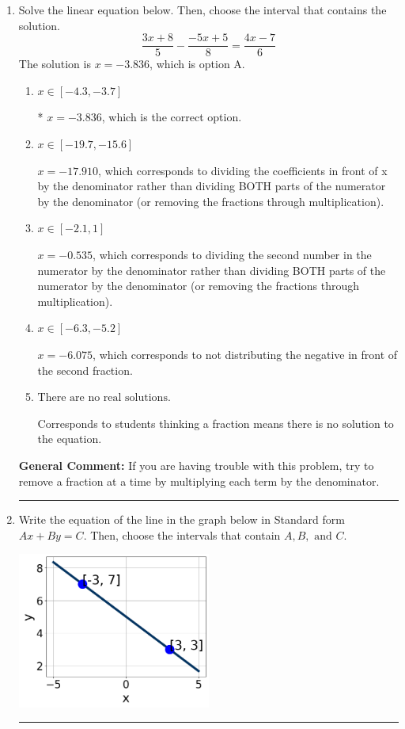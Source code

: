 \documentclass{extbook}[14pt]
\newcommand{\litem}[1]{\item #1

\rule{\textwidth}{0.4pt}}
\begin{document}
\begin{enumerate}\litem{
Solve the linear equation below. Then, choose the interval that contains the solution.
\[ \frac{3x + 8}{5} - \frac{-5x + 5}{8} = \frac{4x -7}{6} \]The solution is \( x = -3.836 \), which is option A.\begin{enumerate}[label=\Alph*.]
\item \( x \in [-4.3, -3.7] \)

* $x = -3.836$, which is the correct option.
\item \( x \in [-19.7, -15.6] \)

 $x = -17.910$, which corresponds to dividing the coefficients in front of x by the denominator rather than dividing BOTH parts of the numerator by the denominator (or removing the fractions through multiplication).
\item \( x \in [-2.1, 1] \)

 $x = -0.535$, which corresponds to dividing the second number in the numerator by the denominator rather than dividing BOTH parts of the numerator by the denominator (or removing the fractions through multiplication).
\item \( x \in [-6.3, -5.2] \)

 $x = -6.075$, which corresponds to not distributing the negative in front of the second fraction.
\item \( \text{There are no real solutions.} \)

Corresponds to students thinking a fraction means there is no solution to the equation.
\end{enumerate}

\textbf{General Comment:} If you are having trouble with this problem, try to remove a fraction at a time by multiplying each term by the denominator.
}
\litem{
Write the equation of the line in the graph below in Standard form $Ax+By=C$. Then, choose the intervals that contain $A, B, \text{ and } C$.

\begin{center}
    \includegraphics[width=0.5\textwidth]{../Figures/linearGraphToStandardA.png}
\end{center}


}
\end{enumerate}
\end{document}

